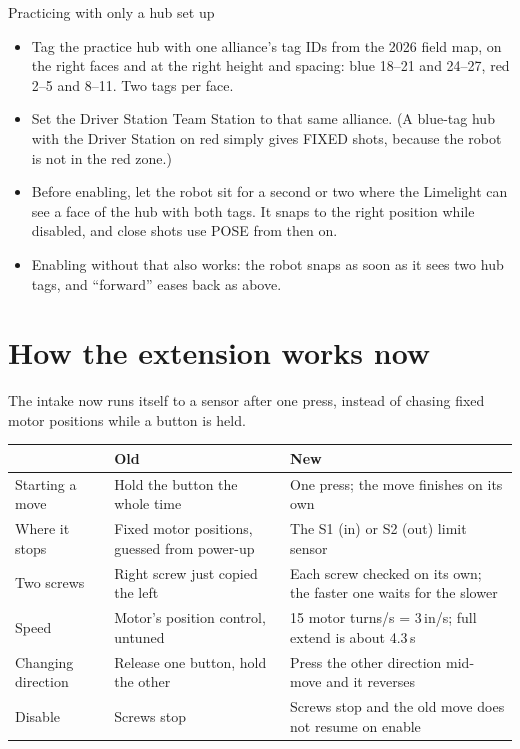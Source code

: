 \documentclass[11pt]{article}
\begin{document}
\begin{drivenote}{Practicing with only a hub set up}
\begin{itemize}[leftmargin=*]
  \item Tag the practice hub with one alliance's tag IDs from the 2026 field map, on the right
    faces and at the right height and spacing: blue 18--21 and 24--27, red 2--5 and 8--11. Two tags
    per face.
  \item Set the Driver Station Team Station to that same alliance. (A blue-tag hub with the
    Driver Station on red simply gives FIXED shots, because the robot is not in the red zone.)
  \item Before enabling, let the robot sit for a second or two where the Limelight can see a face
    of the hub with both tags. It snaps to the right position while disabled, and close shots use
    POSE from then on.
  \item Enabling without that also works: the robot snaps as soon as it sees two hub tags, and
    ``forward'' eases back as above.
\end{itemize}
\end{drivenote}

\medskip
\section*{How the extension works now}

The intake now runs itself to a sensor after one press, instead of chasing fixed motor
positions while a button is held.

\begin{xltabular}{\linewidth}{>{\raggedright\arraybackslash}p{2.8cm} L L}
\toprule
 & \textbf{Old} & \textbf{New} \\
\midrule
\endhead
Starting a move    & Hold the button the whole time                   & One press; the move finishes on its own \\
Where it stops     & Fixed motor positions, guessed from power-up     & The S1 (in) or S2 (out) limit sensor \\
Two screws         & Right screw just copied the left                 & Each screw checked on its own; the faster one waits for the slower \\
Speed              & Motor's position control, untuned                & 15 motor turns/s = 3\,in/s; full extend is about 4.3\,s \\
Changing direction & Release one button, hold the other               & Press the other direction mid-move and it reverses \\
Disable            & Screws stop                                      & Screws stop and the old move does not resume on enable \\
\bottomrule
\end{xltabular}
\end{document}
